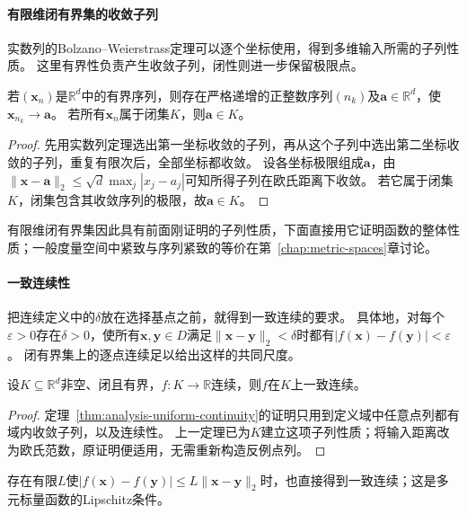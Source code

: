 \paragraph{有限维闭有界集的收敛子列}
实数列的Bolzano--Weierstrass定理可以逐个坐标使用，得到多维输入所需的子列性质。
这里有界性负责产生收敛子列，闭性则进一步保留极限点。
\begin{theorem}[有限维有界序列的收敛子列]
\label{thm:multivariable-bolzano-weierstrass}
若$(\bm x_n)$是$\mathbb R^d$中的有界序列，则存在严格递增的正整数序列$(n_k)$及$\bm a\in\mathbb R^d$，使$\bm x_{n_k}\to\bm a$。
若所有$\bm x_n$属于闭集$K$，则$\bm a\in K$。
\end{theorem}
\begin{proof}
先用实数列定理选出第一坐标收敛的子列，再从这个子列中选出第二坐标收敛的子列，重复有限次后，全部坐标都收敛。
设各坐标极限组成$\bm a$，由$\lVert\bm x-\bm a\rVert_2\leq\sqrt d\max_j|x_j-a_j|$可知所得子列在欧氏距离下收敛。
若它属于闭集$K$，闭集包含其收敛序列的极限，故$\bm a\in K$。
\end{proof}
有限维闭有界集因此具有前面刚证明的子列性质，下面直接用它证明函数的整体性质；一般度量空间中紧致与序列紧致的等价在第~\ref{chap:metric-spaces}章讨论。

\paragraph{一致连续性}
把连续定义中的$\delta$放在选择基点之前，就得到一致连续的要求。
具体地，对每个$\varepsilon>0$存在$\delta>0$，使所有$\bm x,\bm y\in D$满足$\lVert\bm x-\bm y\rVert_2<\delta$时都有$|f(\bm x)-f(\bm y)|<\varepsilon$。
闭有界集上的逐点连续足以给出这样的共同尺度。
\begin{theorem}[闭有界集上的一致连续性]
\label{thm:multivariable-uniform-continuity}
设$K\subseteq\mathbb R^d$非空、闭且有界，$f:K\to\mathbb R$连续，则$f$在$K$上一致连续。
\end{theorem}
\begin{proof}
定理~\ref{thm:analysis-uniform-continuity}的证明只用到定义域中任意点列都有域内收敛子列，以及连续性。
上一定理已为$K$建立这项子列性质；将输入距离改为欧氏范数，原证明便适用，无需重新构造反例点列。
\end{proof}
存在有限$L$使$|f(\bm x)-f(\bm y)|\leq L\lVert\bm x-\bm y\rVert_2$时，也直接得到一致连续；这是多元标量函数的Lipschitz条件。

